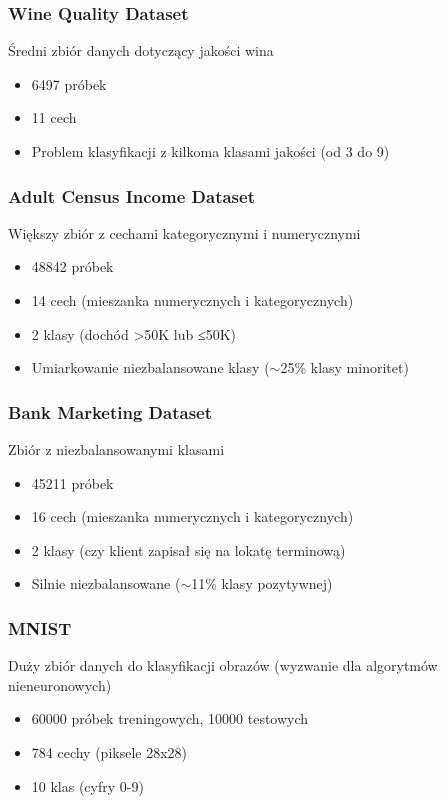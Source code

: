 \documentclass[11pt,a4paper]{article}
\begin{document}
\subsubsection{Wine Quality Dataset}
Średni zbiór danych dotyczący jakości wina
\begin{itemize}
    \item 6497 próbek
    \item 11 cech
    \item Problem klasyfikacji z kilkoma klasami jakości (od 3 do 9)
\end{itemize}

\subsubsection{Adult Census Income Dataset}
Większy zbiór z cechami kategorycznymi i numerycznymi
\begin{itemize}
    \item 48842 próbek
    \item 14 cech (mieszanka numerycznych i kategorycznych)
    \item 2 klasy (dochód >50K lub ≤50K)
    \item Umiarkowanie niezbalansowane klasy ($\sim$25\% klasy minoritet)
\end{itemize}

\subsubsection{Bank Marketing Dataset}
Zbiór z niezbalansowanymi klasami
\begin{itemize}
    \item 45211 próbek
    \item 16 cech (mieszanka numerycznych i kategorycznych)
    \item 2 klasy (czy klient zapisał się na lokatę terminową)
    \item Silnie niezbalansowane ($\sim$11\% klasy pozytywnej)
\end{itemize}

\subsubsection{MNIST}
Duży zbiór danych do klasyfikacji obrazów (wyzwanie dla algorytmów nieneuronowych)
\begin{itemize}
    \item 60000 próbek treningowych, 10000 testowych
    \item 784 cechy (piksele 28x28)
    \item 10 klas (cyfry 0-9)
\end{itemize}
\end{document}
